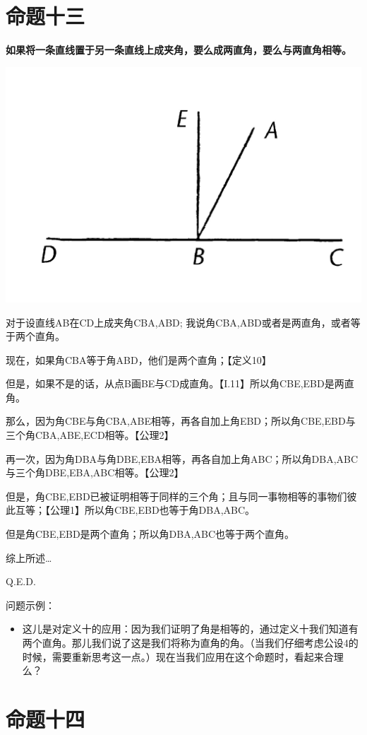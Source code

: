 \documentclass[
]{book}
\providecommand{\tightlist}{%
  \setlength{\itemsep}{0pt}\setlength{\parskip}{0pt}}
\begin{document}
\hypertarget{ux547dux9898ux5341ux4e09}{%
\section{命题十三}\label{ux547dux9898ux5341ux4e09}}

\textbf{如果将一条直线置于另一条直线上成夹角，要么成两直角，要么与两直角相等。}

\includegraphics[width=0.4\linewidth]{./image/img475}

对于设直线AB在CD上成夹角CBA,ABD; 我说角CBA,ABD或者是两直角，或者等于两个直角。

现在，如果角CBA等于角ABD，他们是两个直角；【定义10】

但是，如果不是的话，从点B画BE与CD成直角。【I.11】所以角CBE,EBD是两直角。

那么，因为角CBE与角CBA,ABE相等，再各自加上角EBD；所以角CBE,EBD与三个角CBA,ABE,ECD相等。【公理2】

再一次，因为角DBA与角DBE,EBA相等，再各自加上角ABC；所以角DBA,ABC与三个角DBE,EBA,ABC相等。【公理2】

但是，角CBE,EBD已被证明相等于同样的三个角；且与同一事物相等的事物们彼此互等；【公理1】所以角CBE,EBD也等于角DBA,ABC。

但是角CBE,EBD是两个直角；所以角DBA,ABC也等于两个直角。

综上所述\ldots{}

Q.E.D.

问题示例：

\begin{itemize}
\tightlist
\item
  这儿是对定义十的应用：因为我们证明了角是相等的，通过定义十我们知道有两个直角。那儿我们说了这是我们将称为直角的角。（当我们仔细考虑公设4的时候，需要重新思考这一点。）现在当我们应用在这个命题时，看起来合理么？
\end{itemize}

\hypertarget{ux547dux9898ux5341ux56db}{%
\section{命题十四}\label{ux547dux9898ux5341ux56db}}
\end{document}
